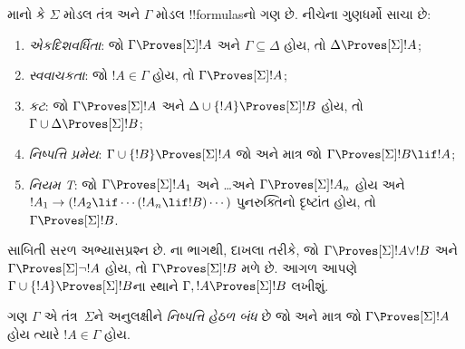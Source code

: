 \documentclass[../../../include/open-logic-section]{subfiles}
\begin{document}


\begin{prop}
  માનો કે $\Sigma$ મોડલ તંત્ર અને $\Gamma$ મોડલ !!{formula}sનો ગણ છે.
  નીચેના ગુણધર્મો સાચા છે:
  \begin{enumerate}
  \item{} \emph{એકદિશવર્ધિતા}: જો
    $\Gamma \Proves[\Sigma] !A$ અને $\Gamma \subseteq \Delta$ હોય, તો
    $\Delta \Proves[\Sigma] !A$;
  \item{}
    \emph{સ્વવાચકતા}: જો $!A \in \Gamma$ હોય, તો $\Gamma
    \Proves[\Sigma] !A$;
  \item{} \emph{કટ}: જો $\Gamma
    \Proves[\Sigma] !A$ અને $\Delta \cup \{!A\} \Proves[\Sigma] !B$
    હોય, તો $\Gamma \cup \Delta \Proves[\Sigma] !B$;
  \item{} \emph{નિષ્પત્તિ પ્રમેય}:
    $\Gamma \cup \{!B\}
    \Proves[\Sigma] !A$ જો અને માત્ર જો $\Gamma \Proves[\Sigma] !B \lif
      !A$;
  \item {}\emph{નિયમ T}: જો
    $\Gamma \Proves[\Sigma] !A_1$ અને \dots અને $\Gamma
    \Proves[\Sigma] !A_n$ હોય અને $!A_1 \to (!A_2 \lif \cdots (!A_n \lif
    !B)\cdots)$ પુનરુક્તિનો દૃષ્ટાંત હોય, તો $\Gamma
    \Proves[\Sigma] !B$.
  \end{enumerate}
\end{prop}

સાબિતી સરળ અભ્યાસપ્રશ્ન છે. ના
 ભાગથી, દાખલા તરીકે, જો
$\Gamma \Proves[\Sigma] !A \lor !B$ અને
$\Gamma \Proves[\Sigma] \lnot !A$ હોય, તો $\Gamma \Proves[\Sigma]
!B$ મળે છે. આગળ આપણે $\Gamma \cup \{ !A\} \Proves[\Sigma] !B$ના
સ્થાને $\Gamma, !A \Proves[\Sigma] !B$ લખીશું.

\begin{defn}
  ગણ $\Gamma$ એ તંત્ર~$\Sigma$ને અનુલક્ષીને \emph{નિષ્પત્તિ હેઠળ બંધ}
  છે જો અને માત્ર જો $\Gamma \Proves[\Sigma] !A$ હોય ત્યારે
  $!A \in \Gamma$ હોય.
\end{defn}
\end{document}
